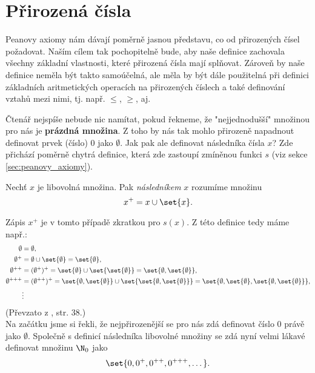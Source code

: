 \section{Přirozená čísla}\label{sec:prirozena_cisla}
Peanovy axiomy nám dávají poměrně jasnou představu, co od přirozených čísel požadovat. Naším cílem tak pochopitelně bude, aby naše definice zachovala všechny základní vlastnosti, které přirozená čísla mají splňovat. Zároveň by naše definice neměla být takto samoúčelná, ale měla by být dále použitelná při definici základních aritmetických operacích na přirozených číslech a také definování vztahů mezi nimi, tj. např. $\leq$, $\geq$, aj.\par
Čtenář nejspíše nebude nic namítat, pokud řekneme, že "nejjednodušší" množinou pro nás je \textbf{prázdná množina}. Z toho by nás tak mohlo přirozeně napadnout definovat prvek (číslo) 0 jako $\emptyset$. Jak pak ale definovat následníka čísla $x$? Zde přichází poměrně chytrá definice, která zde zastoupí zmíněnou funkci $s$ (viz sekce \ref{sec:peanovy_axiomy}).
\begin{definition}[Následník]\label{def:naslednik}
    Nechť $x$ je libovolná množina. Pak \emph{následníkem} $x$ rozumíme množinu
    \begin{equation*}
        x^+=x\cup\set{x}.
    \end{equation*}
\end{definition}
Zápis $x^+$ je v tomto případě zkratkou pro $s(x)$. Z této definice tedy máme např.:
\begin{align*}
    \emptyset&=\emptyset,\\
    \emptyset^+&=\emptyset\cup\set{\emptyset}=\set{\emptyset},\\
    \emptyset^{++}&=(\emptyset^+)^+=\set{\emptyset}\cup\set{\set{\emptyset}}=\set{\emptyset,\set{\emptyset}},\\
    \emptyset^{+++}&=(\emptyset^{++})^+=\set{\emptyset,\set{\emptyset}}\cup\set{\set{\emptyset,\set{\emptyset}}}=\set{\emptyset,\set{\emptyset},\set{\emptyset,\set{\emptyset}}},\\
    &\vdots
\end{align*}
(Převzato z \cite{Goldrei2017}, str. 38.)\\
Na začátku jsme si řekli, že nejpřirozenější se pro nás zdá definovat číslo 0 právě jako $\emptyset$. Společně s definicí následníka libovolné množiny se zdá nyní velmi lákavé definovat množinu $\N_0$ jako
\begin{equation*}
    \set{0,0^+,0^{++},0^{+++},\dots}.
\end{equation*}
